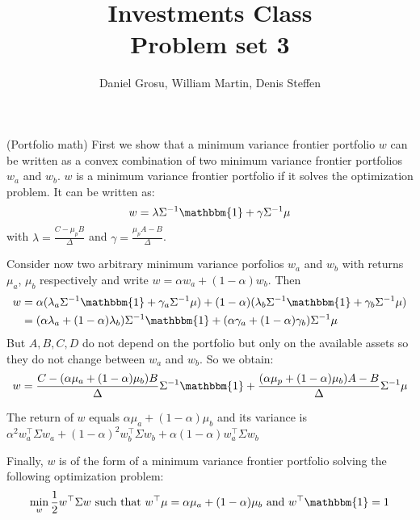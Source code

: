 \documentclass[10pt]{article}
\newenvironment{exercise}[2][Exercise]{\begin{trivlist}
  \item[\hskip \labelsep {\bfseries #1}\hskip \labelsep {\bfseries #2.}]}{\end{trivlist}}
\begin{document}
	
  \renewcommand{\qedsymbol}{\smiley}
	\title{Investments Class \\ Problem set 3}
	\author{Daniel Grosu, William Martin, Denis Steffen}
	
	\maketitle

  \begin{exercise}{1}

\end{exercise}

\begin{exercise}{2}(Portfolio math)
   First we show that a minimum variance frontier portfolio $w$ can be written as a convex combination of two minimum variance frontier portfolios $w_a$ and $w_b$.
   $w$ is a minimum variance frontier portfolio if it solves the optimization problem. It can be written as: 
   $$ w = \lambda\Sigma^{-1}\mathbbm{1}+ \gamma\Sigma^{-1}\mu$$ with $\lambda = \frac{C- \mu_pB}{\Delta}$ and $\gamma = \frac{\mu_pA-B}{\Delta}$. 

   Consider now two arbitrary minimum variance porfolios $w_a$ and $w_b$ with returns $\mu_a$, $\mu_b$ respectively and write $w = \alpha w_a + (1-\alpha)w_b$. 
   Then \begin{align*}
    w &= \alpha (\lambda_a\Sigma^{-1}\mathbbm{1} + \gamma_a\Sigma^{-1}\mu) + (1-\alpha)(\lambda_b\Sigma^{-1}\mathbbm{1} + \gamma_b\Sigma^{-1}\mu) \\
    &= (\alpha \lambda_a + (1-\alpha) \lambda_b)\Sigma^{-1}\mathbbm{1} + (\alpha \gamma_a + (1-\alpha) \gamma_b)\Sigma^{-1}\mu
   \end{align*} 
   But $A,B,C,D$ do not depend on the portfolio but only on the available assets so they do not change between $w_a$ and $w_b$. So we obtain:
   $$ w = \frac{C- (\alpha\mu_a+(1-\alpha)\mu_b)B}{\Delta}\Sigma^{-1}\mathbbm{1} + \frac{(\alpha\mu_p + (1-\alpha)\mu_b)A-B}{\Delta}\Sigma^{-1}\mu$$

  The return of $w$ equals $\alpha\mu_a+(1-\alpha)\mu_b$ and its variance is $\alpha^2 w_a^\top\Sigma w_a + (1-\alpha)^2 w_b^\top\Sigma w_b + \alpha(1-\alpha)w_a^\top\Sigma w_b$

  Finally, $w$ is of the form of a minimum variance frontier portfolio solving the following optimization problem: 
  $$ \min_{w} \frac{1}{2} w^\top\Sigma w \text{ such that } w^\top\mu = \alpha\mu_a+(1-\alpha)\mu_b \text{ and } w^\top\mathbbm{1} = 1$$
  

\end{exercise}
\end{document}
